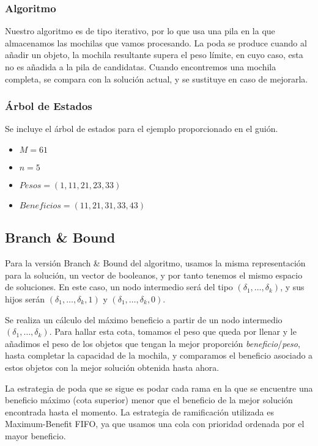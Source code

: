 \documentclass[a4paper, 11pt]{article} %
\begin{document}
	\subsubsection{Algoritmo}
	  Nuestro algoritmo es de tipo iterativo, por lo que usa una pila en la que almacenamos las mochilas que 
	  vamos procesando. La poda se produce cuando al añadir un objeto, la mochila resultante supera el peso 
	  límite, en cuyo caso, esta no es añadida a la pila de candidatas. Cuando encontremos una mochila completa, 
	  se compara con la solución actual, y se sustituye en caso de mejorarla. 
    
	  \small
	    \texttt{}
	  \normalsize
	  
	\subsubsection{Árbol de Estados}
	Se incluye el árbol de estados para el ejemplo proporcionado en el guión. 
	\begin{itemize}
	\item $M = 61$
	\item $n = 5$
	\item $Pesos = (1, 11, 21, 23, 33)$
	\item $Beneficios = (11, 21, 31, 33, 43)$
	\end{itemize}
	 \tiny
	   	\texttt{}
	 \normalsize
    
    
	\subsection{Branch \& Bound}
	  Para la versión Branch \& Bound del algoritmo, usamos la misma representación para la solución, 
	  un vector de booleanos, y por tanto tenemos el mismo espacio de soluciones. En este caso, un nodo 
	  intermedio será del tipo $(\delta_1, \dots, \delta_k)$, y sus hijos serán $(\delta_1, \dots, \delta_k, 1)$ 
	  y $(\delta_1, \dots, \delta_k, 0)$.
	  
	  Se realiza un cálculo del máximo beneficio a partir de un nodo intermedio $(\delta_1, \dots, \delta_k)$. 
	  Para hallar esta cota, tomamos el peso que queda por llenar y le añadimos el peso de los objetos que tengan
	  la mejor proporción \textit{beneficio}/\textit{peso}, hasta completar la capacidad de la mochila, y comparamos
	  el beneficio asociado a estos objetos con la mejor solución obtenida hasta ahora.
	  
	  La estrategia de poda que se sigue es podar cada rama en la que se encuentre una beneficio máximo (cota superior) 
	  menor que el beneficio de la mejor solución encontrada hasta el momento. La estrategia de ramificación utilizada es 
	  Maximum-Benefit FIFO, ya que usamos una cola con prioridad ordenada por el mayor beneficio.
      
\end{document}
